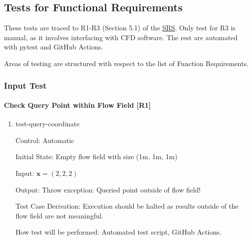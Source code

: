 \documentclass[12pt, titlepage]{article}
\begin{document}
\subsection{Tests for Functional Requirements} \label{FuncTest}

These tests are traced to R1-R3 (Section 5.1) of the \href{https://github.com/omltcat/turbulent-flow/blob/main/docs/SRS/SRS.pdf}{SRS}. Only test for R3 is manual, as it involves interfacing with CFD software. The rest are automated with pytest and GitHub Actions.

Areas of testing are structured with respect to the list of Function Requirements.



\subsubsection{Input Test} \label{ST:Input}


		
\paragraph{Check Query Point within Flow Field [R1]}

\begin{enumerate}

\item{test-query-coordinate\\}

Control: Automatic
					
Initial State: Empty flow field with size (1m, 1m, 1m)
					
Input: $\mathbf{x}=(2,2,2)$
					
Output: Throw exception: Queried point outside of flow field!

Test Case Derivation: Execution should be halted as results outside of the flow field are not meaningful.
					
How test will be performed: Automated test script, GitHub Actions.

\end{enumerate}
\end{document}
